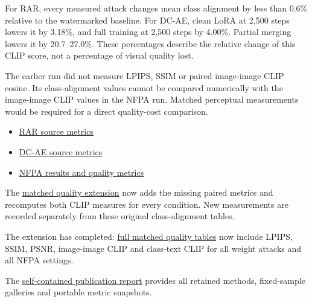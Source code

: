 For RAR, every measured attack changes mean class alignment by less than
0.6\% relative to the watermarked baseline. For DC-AE, clean LoRA at
2,500 steps lowers it by 3.18\%, and full training at 2,500 steps by
4.00\%. Partial merging lowers it by 20.7--27.0\%. These percentages
describe the relative change of this CLIP score, not a percentage of
visual quality lost.

The earlier run did not measure LPIPS, SSIM or paired image-image CLIP
cosine. Its class-alignment values cannot be compared numerically with
the image-image CLIP values in the NFPA run. Matched perceptual
measurements would be required for a direct quality-cost comparison.

\begin{itemize}
\tightlist
\item
  \href{../docs/watermarking/data/metrics.json}{RAR source metrics}
\item
  \href{../docs/watermarking/data/metrics.json}{DC-AE source metrics}
\item
  \href{records/docs/closed_image_results.tex}{NFPA results and quality
  metrics}
\end{itemize}

The \href{records/docs/matched_image_quality.tex}{matched quality
extension} now adds the missing paired metrics and recomputes both CLIP
measures for every condition. New measurements are recorded separately
from these original class-alignment tables.

The extension has completed:
\href{records/docs/matched_image_quality_results.tex}{full matched
quality tables} now include LPIPS, SSIM, PSNR, image-image CLIP and
class-text CLIP for all weight attacks and all NFPA settings.

The \href{../docs/watermarking/README.md}{self-contained publication
report} provides all retained methods, fixed-sample galleries and
portable metric snapshots.
